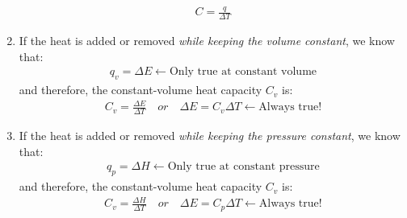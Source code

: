 \documentclass{article}  %
\begin{document}
\begin{enumerate}
        \begin{equation*}
            \begin{aligned}
                C = \frac{q}{\Delta T}
            \end{aligned}
        \end{equation*}
    \item If the heat is added or removed \emph{while keeping the volume constant}, we know that:
        \begin{equation*}
            \begin{aligned}
                q_v = \Delta E \leftarrow\text{Only true at constant volume}
            \end{aligned}
        \end{equation*}
        and therefore, the constant-volume heat capacity $C_v$ is:
        \begin{equation*}
            \begin{aligned}
                C_v = \frac{\Delta E}{\Delta T} \quad or \quad \Delta E = C_v \Delta T \leftarrow\text{Always true!}
            \end{aligned}
        \end{equation*}
    \item If the heat is added or removed \emph{while keeping the pressure constant}, we know that:
    \begin{equation*}
        \begin{aligned}
            q_p = \Delta H \leftarrow\text{Only true at constant pressure}
        \end{aligned}
    \end{equation*}
    and therefore, the constant-volume heat capacity $C_v$ is:
    \begin{equation*}
        \begin{aligned}
            C_v = \frac{\Delta H}{\Delta T} \quad or \quad \Delta E = C_p \Delta T \leftarrow\text{Always true!}
        \end{aligned}
    \end{equation*}
\end{enumerate}
\end{document}
